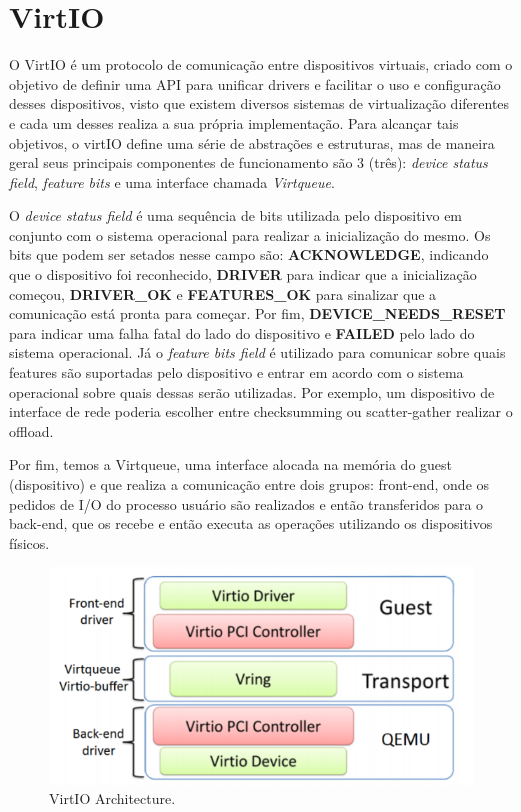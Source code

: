 \graphicspath{ {../img/} }

\section*{VirtIO}

O VirtIO é um protocolo de comunicação entre dispositivos virtuais, criado com o objetivo de definir uma API para unificar drivers e facilitar o uso e configuração desses dispositivos, 
visto que existem diversos sistemas de virtualização diferentes e cada um desses realiza a sua própria implementação.
Para alcançar tais objetivos, o virtIO define uma série de abstrações e estruturas, mas de maneira geral seus principais componentes de funcionamento são 3 (três): 
\emph{device status field}, \emph{feature bits} e uma interface chamada \emph{Virtqueue}.


O \emph{device status field} é uma sequência de bits utilizada pelo dispositivo em conjunto com o sistema operacional para realizar a inicialização do mesmo.
Os bits que podem ser setados nesse campo são: \textbf{ACKNOWLEDGE}, indicando que o dispositivo foi reconhecido, \textbf{DRIVER} para indicar que a inicialização começou, \textbf{DRIVER{\_}OK} e \textbf{FEATURES{\_}OK} para sinalizar que a comunicação está pronta para começar.
Por fim, \textbf{DEVICE{\_}NEEDS{\_}RESET} para indicar uma falha fatal do lado do dispositivo e \textbf{FAILED} pelo lado do sistema operacional.
Já o \emph{feature bits field} é utilizado para comunicar sobre quais features são suportadas pelo dispositivo e entrar em acordo com o sistema operacional sobre quais dessas serão utilizadas. Por exemplo, um dispositivo de interface de rede poderia escolher entre checksumming ou scatter-gather realizar o offload.

Por fim, temos a Virtqueue, uma interface alocada na memória do guest (dispositivo) e que realiza a comunicação entre dois grupos: front-end, onde os pedidos de I/O do processo usuário são realizados e então transferidos para o back-end, que os recebe e então executa as operações utilizando os dispositivos físicos. 

\begin{figure}[t]
  \centering
  \includegraphics[width=0.85\linewidth]{virtio-arch.png}
  \caption{VirtIO Architecture.}
\end{figure}

